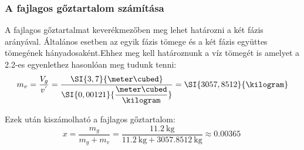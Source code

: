 \subsubsection{A fajlagos gőztartalom számítása}
A fajlagos gőztartalmat keverékmezőben meg lehet határozni a két fázis arányával. Általános esetben az egyik fázis tömege és a két fázis együttes tömegének hányadosaként.Ehhez meg kell határoznunk a víz tömegét is amelyet a 2.2-es egyenlethez hasonlóan meg tudunk tenni:
\begin{equation}
	m_{v} = \dfrac{V_{g}}{v^{'}}
	=
	\dfrac{\SI{3,7}{\meter\cubed}}{\SI{0,00121}{\dfrac{\meter\cubed}{\kilogram}}}
	= 
	\SI{3057,8512}{\kilogram}
\end{equation}
 
\noindent Ezek után kiszámolható a fajlagos gőztartalom:
\begin{equation}
	x = \dfrac{m_{g}}{m_{g} + m_{v}}
	=
	\dfrac{\SI{11,2}{\kilogram}}{\SI{11,2}{\kilogram} + \SI{3057,8512}{\kilogram}}
	\approx
	 \SI{0,00365}{}
\end{equation}
